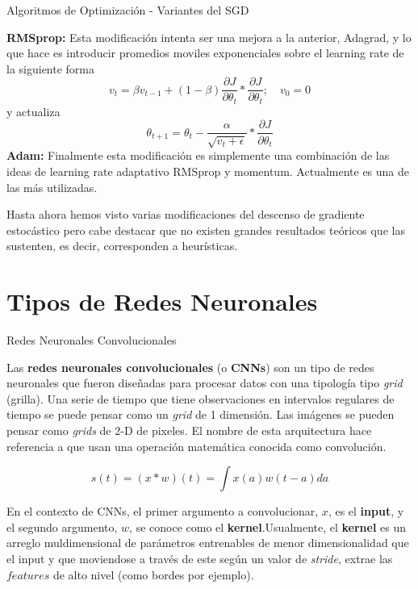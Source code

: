 \documentclass[9pt]{beamer}
\begin{document}
\begin{frame}{Algoritmos de Optimización - Variantes del SGD}

\textbf{RMSprop: } Esta modificación intenta ser una mejora a la anterior, Adagrad, y lo que hace es introducir promedios moviles exponenciales sobre el learning rate de la siguiente forma \pause
\[
v_t = \beta v_{t-1} + (1-\beta)\frac{\partial J}{\partial \theta_t} * \frac{\partial J}{\partial \theta_t} ; \quad v_0 = 0
\] \pause
y actualiza 
\[
\theta_{t+1} = \theta_t - \frac{\alpha}{\sqrt{v_t + \epsilon}} * \frac{\partial J}{\partial \theta_t}
\] \pause 
\textbf{Adam: } Finalmente esta modificación es simplemente una combinación de las ideas de  learning rate adaptativo RMSprop y momentum. Actualmente es una de las más utilizadas. \pause

\vspace{0.2cm}

\begin{observacion}
Hasta ahora hemos visto varias modificaciones del descenso de gradiente estocástico pero cabe destacar que no existen grandes resultados teóricos que las sustenten, es decir, corresponden a heurísticas.
\end{observacion}
\end{frame}

\section{Tipos de Redes Neuronales}

\begin{frame}{Redes Neuronales Convolucionales}

Las \textbf{redes neuronales convolucionales} (o \textbf{CNNs}) son un tipo de redes neuronales que fueron diseñadas para procesar datos con una tipología tipo \textit{grid} (grilla). Una serie de tiempo que tiene observaciones en intervalos regulares de tiempo se puede pensar como un \textit{grid} de 1 dimensión. Las imágenes se pueden pensar como \textit{grids} de 2-D de pixeles. El nombre de esta arquitectura hace referencia a que usan una operación matemática conocida como convolución. \pause 

\begin{equation*}
s(t) = (x * w)(t) = \int x(a)w(t-a)da
\end{equation*} \pause 

En el contexto de CNNs, el primer argumento a convolucionar, $x$, es el \textbf{input}, y el segundo argumento, $w$, se conoce como el \textbf{kernel}.\pause Usualmente, el \textbf{kernel} es un arreglo muldimensional de parámetros entrenables de menor dimensionalidad que el input y que moviendose a través de este según un valor de \textit{stride}, extrae las $\textit{features}$ de alto nivel (como bordes por ejemplo). 

\end{frame}
\end{document}
